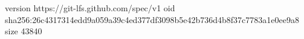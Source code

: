 version https://git-lfs.github.com/spec/v1
oid sha256:26c4317314edd9a059a39c4ed377df3098b5e42b736d4b8f37c7783a1e0ee9a8
size 43840
